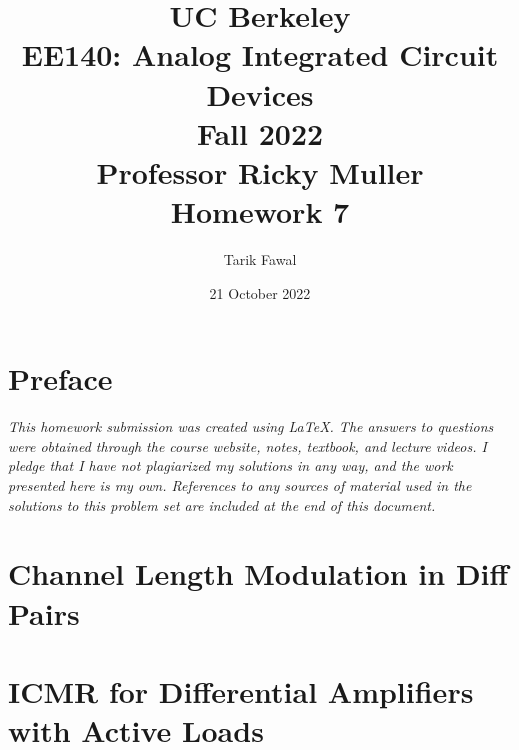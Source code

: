 \documentclass[12pt, fleqn]{article}
\title {
    \normalsize{UC Berkeley}\\
    \large{{EE140: Analog Integrated Circuit Devices\\Fall 2022\\Professor Ricky Muller\\}}
    \vspace{0.5ex}
    \Huge{Homework 7}
    \vspace{0.5ex}
}
\author{Tarik Fawal}
\date{21 October 2022}
\begin{document}
\maketitle
\tableofcontents
\flushbottom
    \section*{Preface}
        \textit{\emph{This homework submission was created using \LaTeX.  The answers to questions were obtained through the course website, notes, textbook, and lecture videos.  I pledge that I have not plagiarized my solutions in any way, and the work presented here is my own.  References to any sources of material used in the solutions to this problem set are included at the end of this document.}}
\section{Channel Length Modulation in Diff Pairs}
%
\section{ICMR for Differential Amplifiers with Active Loads}
%
\end{document}
